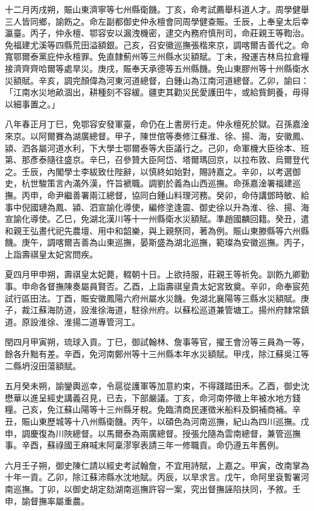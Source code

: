 \begin{pinyinscope}
十二月丙戌朔，賑山東濟寧等七州縣衛饑。丁亥，命考試薦舉科道人才。周學健舉三人皆同鄉，諭飭之。命左副都御史仲永檀會同周學健查賑。壬辰，上奉皇太后幸瀛臺。丙子，仲永檀、鄂容安以漏洩機密，逮交內務府慎刑司，命莊親王等鞫治。免福建尤溪等四縣荒田溢額銀。己亥，召安徽巡撫張楷來京，調喀爾吉善代之。命寬鄂爾泰黨庇仲永檀罪。免直隸薊州等三州縣水災額賦。丁未，撥運吉林烏拉倉糧接濟齊齊哈爾等處旱災。庚戌，賑奉天承德等五州縣饑。免山東膠州等十州縣衛水災額賦。辛亥，調完顏偉為河東河道總督，白鍾山為江南河道總督。乙卯，諭曰：「江南水災地畝涸出，耕種刻不容緩。疆吏其勸災民愛護田牛，或給貲飼養，毋得以細事置之。」

八年春正月丁巳，免鄂容安發軍臺，命仍在上書房行走。仲永檀死於獄。召孫嘉淦來京。以阿爾賽為湖廣總督。甲子，陳世倌等奏修江蘇淮、徐、揚、海，安徽鳳、潁、泗各屬河道水利，下大學士鄂爾泰等大臣議行之。己卯，命軍機大臣徐本、班第、那彥泰隨往盛京。辛巳，召參贊大臣阿岱、塔爾瑪回京，以拉布敦、烏爾登代之。壬辰，內閣學士李紱致仕陛辭，以慎終如始對，賜詩嘉之。辛卯，以考選御史，杭世駿策言內滿外漢，忤旨褫職。調劉於義為山西巡撫。命孫嘉淦署福建巡撫。丙申，命尹繼善署兩江總督，協同白鍾山料理河務。癸卯，命侍講鄧時敏、給事中倪國璉為鳳、潁、泗宣諭化導使，編修塗逢震、御史徐以升為淮、徐、揚、海宣諭化導使。乙巳，免湖北漢川等十一州縣衛水災額賦。準趙國麟回籍。癸丑，遣和親王弘晝代祀先農壇、用中和韶樂，與上親祭同，著為例。賑山東滕縣等六州縣饑。庚午，調喀爾吉善為山東巡撫，晏斯盛為湖北巡撫，範璨為安徽巡撫。丙子，上詣壽祺皇太妃宮問疾。

夏四月甲申朔，壽祺皇太妃薨，輟朝十日。上欲持服，莊親王等祈免。訓飭九卿勤事。申命各督撫陳奏屬員賢否。乙酉，上詣壽祺皇貴太妃宮致奠。辛卯，命奉宸苑試行區田法。丁酉，賑安徽鳳陽六府州屬水災饑。免湖北襄陽等三縣水災額賦。庚子，裁江蘇海防道，設淮徐海道，駐徐州府。以蘇松巡道兼管塘工。揚州府隸常鎮道。原設淮徐、淮揚二道專管河工。

閏四月甲寅朔，琉球入貢。丁巳，御試翰林、詹事等官，擢王會汾等三員為一等，餘各升黜有差。辛酉，免河南鄭州等十三州縣本年水災額賦。甲戌，除江蘇吳江等二縣坍沒田蕩額賦。

五月癸未朔，諭鑾輿巡幸，令扈從護軍等加意約束，不得踐踏田禾。乙酉，御史沈懋華以進呈經史講義召見，已去，下部嚴議。丁亥，命河南停徵上年被水地方錢糧。己亥，免江蘇山陽等十三州縣牙稅。免臨清商民運徵米船料及銅補商補。辛丑，賑山東歷城等十八州縣衛饑。丙午，以碩色為河南巡撫，紀山為四川巡撫。戊申，調慶復為川陜總督。以馬爾泰為兩廣總督。授張允隨為雲南總督，兼管巡撫事。辛酉，蘇祿國王麻喊末阿稟漻寧表請三年一修職貢。命仍遵五年舊例。

六月壬子朔，御史陳仁請以經史考試翰詹，不宜用詩賦，上嘉之。甲寅，改南掌為十年一貢。乙卯，除江蘇沛縣水沈地賦。丙辰，以旱求言。戊午，命阿里袞暫署河南巡撫。丁卯，以御史胡定劾湖南巡撫許容一案，究出督撫誣陷扶同，予敘。壬申，諭督撫率屬重農。


\end{pinyinscope}
